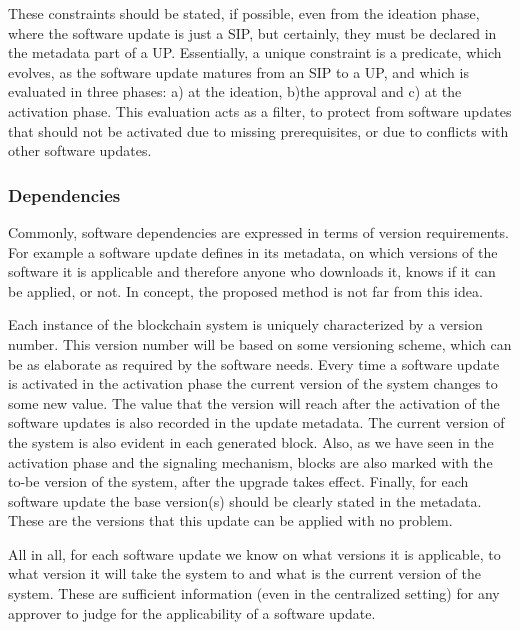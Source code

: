 These constraints should be stated, if possible, even from the ideation phase, where the software update is just a SIP, but certainly, they must be declared in the metadata part of a UP. Essentially, a unique constraint is a predicate, which evolves, as the software update matures from an SIP to a UP,  and which is evaluated in three phases: a) at the ideation, b)the approval and c) at the activation phase. This evaluation acts as a filter, to protect from software updates that should not be activated due to missing prerequisites, or due to conflicts with other software updates.

\subsubsection{Dependencies}
Commonly, software dependencies are expressed in terms of version requirements. For example a software update defines in its metadata, on which versions of the software it is applicable and therefore anyone who downloads it, knows if it can be applied, or not. In concept, the proposed method is not far from this idea.

Each instance of the blockchain system is uniquely characterized by a version number. This version number will be based on some versioning scheme, which can be as elaborate as required by the software needs. Every time a software update is activated in the activation phase the current version of the system changes to some new value. The value that the version will reach after the activation of the software updates is also recorded in the update metadata. The current version of the system is also evident in each generated block. Also, as we have seen in the activation phase and the signaling mechanism, blocks are also marked with the to-be version of the system, after the upgrade takes effect. Finally, for each software update the base version(s) should be clearly stated in the metadata. These are the versions that this update can be applied with no problem. 

All in all, for each software update we know on what versions it is applicable, to what version it will take the system to and what is the current version of the system. These are sufficient information (even in the centralized setting) for any approver to judge for the applicability of a software update.

%
%

